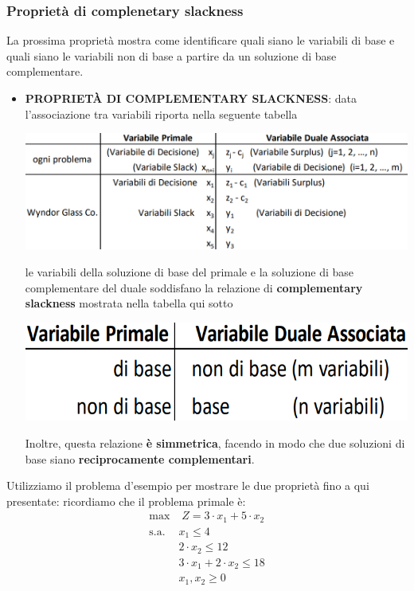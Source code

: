\documentclass[12pt]{article}
\begin{document}
\subsubsection{Proprietà di complenetary slackness}
La prossima proprietà mostra come identificare quali siano le variabili di base e quali siano le variabili non di base a partire da un soluzione di base complementare.
\begin{itemize}
    \item \textbf{PROPRIETÀ DI COMPLEMENTARY SLACKNESS}: data l'associazione tra variabili riporta nella seguente tabella 
    \begin{center}
        \includegraphics[width = 1\linewidth]{Images/51.png}
    \end{center}
    le variabili della soluzione di base del primale e la soluzione di base complementare del duale soddisfano la relazione di \textbf{complementary slackness} mostrata nella tabella qui sotto
    \begin{center}
        \includegraphics[width = 0.60\linewidth]{Images/52.png}
    \end{center}
    Inoltre, questa relazione \textbf{è simmetrica}, facendo in modo che due soluzioni di base siano \textbf{reciprocamente complementari}.
\end{itemize}
Utilizziamo il problema d'esempio per mostrare le due proprietà fino a qui presentate:
ricordiamo che il problema primale è:
\begin{equation*}
    \begin{array}{ll}
        \displaystyle \textrm{max} & \; Z = 3 \cdot x_1 + 5 \cdot x_2\\
        \textrm{s.a.} & x_1 \leq 4\\
        \phantom{} & 2 \cdot x_2 \leq 12\\
        \phantom{} & 3 \cdot x_1 + 2 \cdot x_2 \leq 18 \\
        \phantom{} & x_1,x_2 \geq 0
    \end{array}
\end{equation*}
\end{document}
